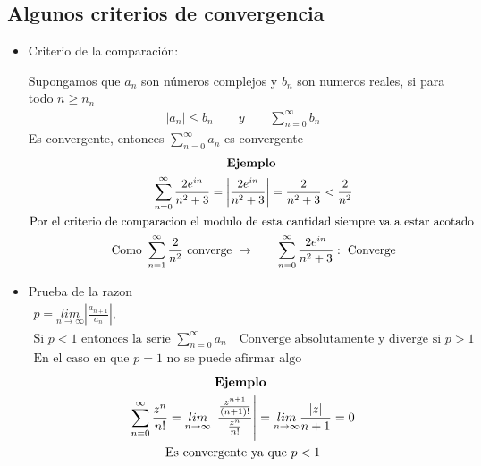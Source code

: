 \documentclass{article}
\begin{document}
\subsection{Algunos criterios de convergencia }
\begin{itemize}
  \item Criterio de la comparación: 

    Supongamos que $ a_n  $ son números complejos y $ b_n  $ son numeros reales, si para todo $ n \geq n_n  $
    \begin{gather*}
      \left|a_n \right|\leq b_n \qquad y \qquad \displaystyle\sum_{n= 0 }^{\infty}b_n  
    \end{gather*}
    Es convergente, entonces $ \displaystyle\sum_{n = 0 }^{\infty}a_n  $ es convergente 
    \begin{gather*}
      \text{\textbf{Ejemplo }}\\
      \displaystyle\sum_{n = 0 }^{\infty} \frac{2 e ^ {i n }}{n ^2 + 3 } = \left|\frac{2 e ^ {in }}{n ^2 + 3 }\right| = \frac{2 }{n ^2 + 3 }<\frac{2 }{n ^2} \\
      \text{Por el criterio de comparacion el modulo de esta cantidad siempre va a estar acotado }\\
      \text{Como }\displaystyle\sum_{n = 1 }^{\infty} \frac{2 }{n ^2} \text{ converge }\rightarrow \qquad \displaystyle\sum_{n = 0 }^{\infty}\frac{2 e ^ {in }}{n ^2 + 3 }: \text{ Converge}
    \end{gather*}
  
  \item Prueba de la razon 
    \begin{gather*}
      p = \underset{n \rightarrow \infty}{lim }\left|\frac{a _{n + 1 } }{a_n } \right|, \qquad  \\
      \text{Si }p<1\text{ entonces la serie }\displaystyle\sum_{n = 0 }^{\infty}a_n \quad \text{Converge absolutamente y diverge si }p>1\\
      \text{En el caso en que }p=1 \text{ no se puede afirmar algo}
    \end{gather*}
    \begin{gather*}
      \text{\textbf{Ejemplo }}\\
      \displaystyle\sum_{n = 0 }^{\infty} \frac{z ^ {n }}{n! } = \underset{n \rightarrow \infty}{lim }\left|\frac{\frac{z ^ {n+ 1 }}{(n+1)! }}{\frac{z^n }{n! }}\right| = \underset{n \rightarrow \infty}{lim} \frac{\left|z \right|}{n+1 } = 0\\
      \text{Es convergente ya que }p<1
    \end{gather*}
\end{itemize}
\end{document}
